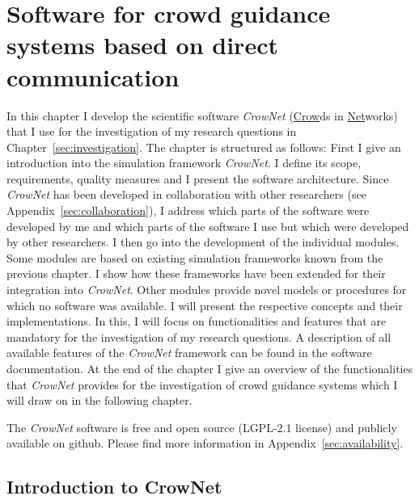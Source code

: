 \chapter{Software for crowd guidance systems based on direct communication  }
\label{sec:crownet}

In this chapter I develop the scientific software \textit{CrowNet} (\underline{Crow}ds in \underline{Net}works) that I use for the investigation of my research questions in Chapter~\ref{sec:investigation}. 
The chapter is structured as follows: First I give an introduction into the simulation framework \textit{CrowNet}. I define its scope, requirements, quality measures and I present the software architecture. Since \textit{CrowNet} has been developed in collaboration with other researchers (see Appendix~\ref{sec:collaboration}), I address which parts of the software were developed by me and which parts of the software I use but which were developed by other researchers. I then go into the development of the individual modules. Some modules are based on existing simulation frameworks known from the previous chapter. I show how these frameworks have been extended for their integration into \textit{CrowNet}. Other modules provide novel models or procedures for which no software was available. I will present the respective concepts and their implementations. In this, I will focus on functionalities and features that are mandatory for the investigation of my research questions. A description of all available features of the \textit{CrowNet} framework can be found in the software documentation. At the end of the chapter I give an overview of the functionalities that \textit{CrowNet} provides for the investigation of crowd guidance systems which I will draw on in the following chapter.










\begin{tcolorbox}[float,floatplacement=hbt!,title=Availability of the simulation software]
The \textit{CrowNet} software is free and open source (LGPL-2.1 license) and publicly available on github. Please find more information in Appendix~\ref{sec:availability}.
\end{tcolorbox}





\section{Introduction to CrowNet}
